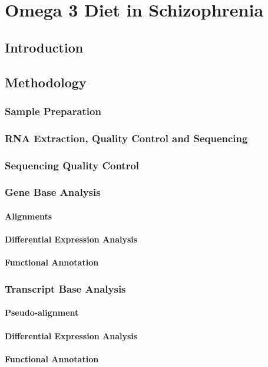 \chapter{Omega 3 Diet in Schizophrenia}
\section{Introduction}
\section{Methodology}
\subsection{Sample Preparation}
\subsection{RNA Extraction, Quality Control and Sequencing}
\subsection{Sequencing Quality Control}
\subsection{Gene Base Analysis}
\subsubsection{Alignments}
\subsubsection{Differential Expression Analysis}
\subsubsection{Functional Annotation}
\subsection{Transcript Base Analysis}
\subsubsection{Pseudo-alignment}
\subsubsection{Differential Expression Analysis}
\subsubsection{Functional Annotation}
